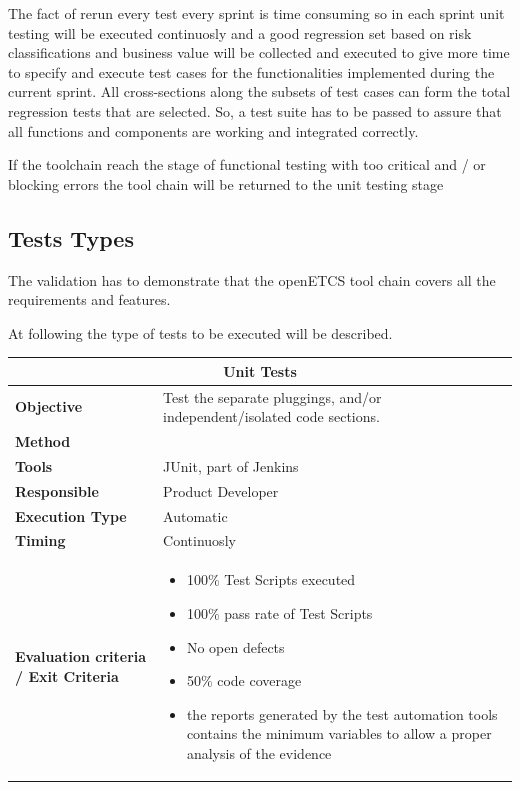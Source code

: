 The fact of rerun every test every sprint is time consuming so in each sprint unit testing will be executed continuosly and a good regression set based on risk classifications and business value will be collected and executed to give more time to specify and execute test cases for the functionalities implemented during the current sprint. All cross-sections along the subsets of test cases can form the total regression tests that are selected. So, a test suite has to be passed to assure that all functions and components are working and integrated correctly.

If the toolchain reach the stage of functional testing with too critical and / or blocking errors the tool chain will be returned to the unit testing stage

\subsection{Tests Types}
The validation has to demonstrate that the openETCS tool chain covers all the requirements and features.

At following the type of tests to be executed will be described.

\begin{center}
\begin{longtable}[H]{|p{4cm}|p{9cm}|}\hline
\multicolumn{2}{|c|}{\textbf{Unit Tests}}\\\hline
\textbf{Objective} &  Test the separate pluggings, and/or independent/isolated code sections.\\\hline
\textbf{Method} & \\\hline
\textbf{Tools} & JUnit, part of Jenkins\\\hline
\textbf{Responsible} & Product Developer\\\hline
\textbf{Execution Type} & Automatic\\\hline
\textbf{Timing} & Continuosly \\\hline
\textbf{Evaluation criteria / Exit Criteria} & \begin{itemize}
\item 100\% Test Scripts executed
\item 100\% pass rate of Test Scripts
\item No open defects
\item 50\% code coverage
\item the reports generated by the test automation tools contains the minimum variables to allow a proper analysis of the evidence
\end{itemize} \\\hline
\end{longtable}
\end{center}

